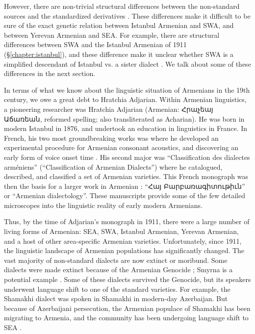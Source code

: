 However, there are non-trivial structural differences between the non-standard sources and the standardized derivatives \citep{SayeedVaux-2017-EvolutionArmenian}. These differences make it difficult to be sure of the exact genetic relation between Istanbul Armenian and SWA, and between Yerevan Armenian and SEA. For example, there are structural differences between SWA and the Istanbul Armenian of 1911 (\S\ref{chapter:istanbul}), and these difference make it unclear whether SWA is a simplified descendant of Istanbul vs. a sister dialect \citep[1148]{SayeedVaux-2017-EvolutionArmenian}. We talk about some of these differences in the next section.

In terms of what we know about the linguistic situation of Armenians in the 19th century, we owe a great debt to Hratchia Adjarian. Within Armenian linguistics, a pioneering researcher was Hratchia Adjarian (Armenian: Հրաչեայ Աճառեան, reformed spelling; also transliterated as Acharian). He was born in modern Istanbul in 1876, and undertook an education in linguistics in France. In French, his two most groundbreaking works was \citet{Adjarian-1899-ArmenianExplosives} where he developed an experimental procedure for Armenian consonant acoustics, and discovering an early form of voice onset time \citep{braun-2013-earlyCaseVOTAdjarian}. His second major was \citet{Adjarian-1909-ClassificationArmenianDialect} ``Classification des dialectes arméniens'' (``Classification of Armenian Dialects'') where he catalogued, described, and classified a set of Armenian varieties. This French monograph was then the basis for a larger work in Armenian \citep{Adjarian-1911-DialectologyBook}: ``Հայ Բարբառագիտութիւն'' or ``Armenian dialectology''. These manuscripts provide some of the few detailed microscopes into the linguistic reality of early modern Armenians. 

Thus, by the time of Adjarian's monograph in 1911, there were a large number of living forms of Armenian: SEA, SWA, Istanbul Armenian, Yerevan Armenian, and a host of other area-specific Armenian varieties. Unfortunately, since 1911, the linguistic landscape of Armenian populations has significantly changed. The vast majority of non-standard dialects are now extinct or moribund. Some dialects were made extinct because of the Armenian Genocide \citep{Katvalyan-2015-GenocideArmenianLanguage}; Smyrna is a potential example \citep{Vaux-2012-ArmenianSmyrna}. Some of these dialects survived the Genocide, but its speakers underwent language shift to one of the standard varieties. For example, the Shamakhi dialect was spoken in Shamakhi in modern-day Azerbaijan. But because of Azerbaijani persecution, the Armenian populace of Shamakhi has been migrating to Armenia, and the community has been undergoing language shift to SEA \citep{Vlasyan-2019-Shamakhi}. 

